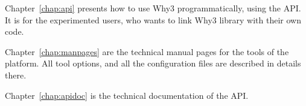 
Chapter~\ref{chap:api} presents how to use Why3 programmatically,
using the API.  It is for the experimented users, who wants to link
Why3 library with their own code.

Chapter~\ref{chap:manpages} are the technical manual pages for the
tools of the platform. All tool options, and all the configuration
files are described in details there.

Chapter~\ref{chap:apidoc} is the technical documentation of the API.



